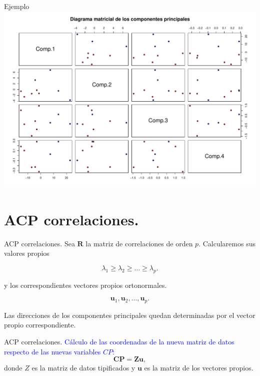 \documentclass[
  ignorenonframetext,
]{beamer}
\newcommand\blue[1]{\textcolor{blue}{#1}}
\begin{document}
\begin{frame}{Ejemplo}
\label{ejemplo-10}
\includegraphics{AnalisisComponentesPrincipales_fusion_files/figure-beamer/pairsacptodos1-1.pdf}
\end{frame}

\section{ACP correlaciones.}\label{acp-correlaciones.}

\begin{frame}{ACP correlaciones.}
\label{acp-correlaciones.-1}
Sea \(\mathbf{R}\) la matriz de correlaciones de orden \(p\).
Calcularemos sus valores propios

\[\lambda_1\geq \lambda_2\geq\ldots\geq\lambda_p.\]

y los correspondientes vectores propios ortonormales.

\[\mathbf{u}_1,\mathbf{u}_2,\ldots,\mathbf{u}_p.\]

Las direcciones de los componentes principales quedan determinadas por
el vector propio correspondiente.
\end{frame}

\begin{frame}{ACP correlaciones.}
\label{acp-correlaciones.-2}
\blue{Cálculo de las coordenadas de la nueva matriz de datos respecto de las
nuevas variables $CP$:} \[\mathbf{CP}= \mathbf{Z} \mathbf{u},\] donde
\(Z\) es la matriz de datos tipificados y \(\mathbf{u}\) es la matriz de
los vectores propios.
\end{frame}
\end{document}
